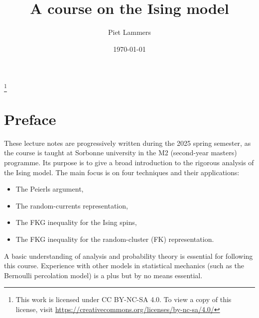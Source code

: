 % 


\makeatletter
{}
\makeatother


\title{A course on the Ising model}


\author{Piet Lammers}
\address{CNRS and Sorbonne Université, LPSM}

\date{\today}

\newcommand\n{\mathbf{n}}
\newcommand\m{\mathbf{m}}
\renewcommand\a{\mathbf{a}}
\renewcommand\b{\mathbf{b}}

\thanks{This work is licensed under CC BY-NC-SA 4.0. To view a copy of this license, visit \url{https://creativecommons.org/licenses/by-nc-sa/4.0/}}




\maketitle

\tableofcontents


\section*{Preface}
These lecture notes are progressively written during the 2025 spring semester,
as the course is taught at Sorbonne university in the M2 (second-year masters) programme.
Its purpose is to give a broad introduction to the rigorous analysis of the Ising model.
The main focus is on four techniques and their applications:
\begin{itemize}
    \item The Peierls argument,
    \item The random-currents representation,
    \item The FKG inequality for the Ising spins,
    \item The FKG inequality for the random-cluster (FK) representation.
\end{itemize}

A basic understanding of analysis and probability theory is essential for following this course.
Experience with other models in statistical mechanics (such as the Bernoulli percolation model)
is a plus but by no means essential.

